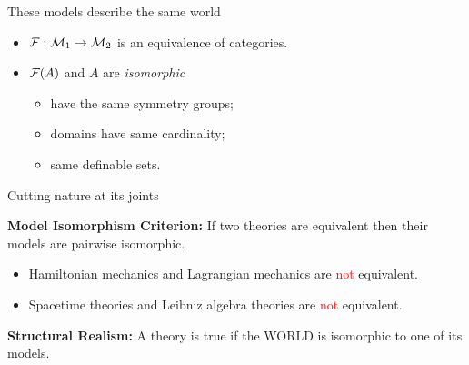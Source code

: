 \documentclass{beamer}
\begin{document}
\begin{frame}{These models describe the same world}



\end{frame}

\begin{frame}


\begin{itemize}
\item $\mathcal F :\mathcal M _1\to\mathcal M _2$ is an equivalence of categories.
\item $\mathcal F (A)$ and $A$ are \emph{isomorphic}
\begin{itemize}
\item have the same symmetry groups;
\item domains have same cardinality;
\item same definable sets.
\end{itemize}
\end{itemize}

\end{frame}

\begin{frame}{Cutting nature at its joints}

  \textbf{Model Isomorphism Criterion:} If two theories are equivalent
  then their models are pairwise isomorphic.

\bigskip
\begin{itemize}
\item Hamiltonian mechanics and Lagrangian mechanics are
  \textcolor{red}{not} equivalent.
\item Spacetime theories and Leibniz algebra theories are
  \textcolor{red}{not} equivalent.
\end{itemize}
\bigskip

\textbf{Structural Realism:} A theory is true if the WORLD is
  isomorphic to one of its models.

\end{frame}
\end{document}
